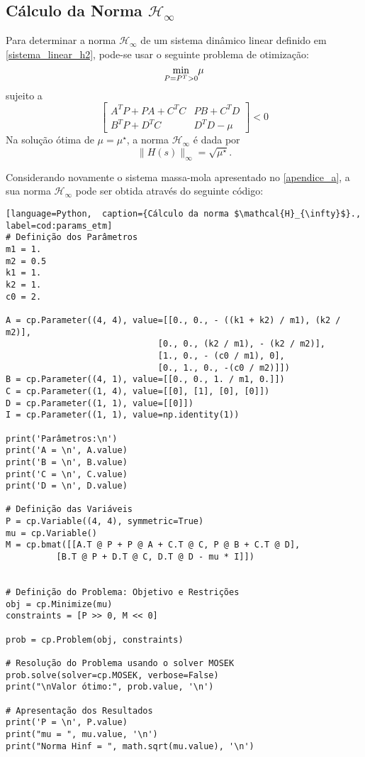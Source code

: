 \subsection{Cálculo da Norma $\mathcal{H}_{\infty}$}

Para determinar a norma $\mathscr{H}_{\infty}$ de um sistema dinâmico linear definido em \eqref{sistema_linear_h2}, pode-se usar o seguinte problema de otimização: $$ \underset{P = P^T > 0}{\min} \space \space \mu $$ sujeito a \begin{equation}
  \begin{bmatrix}
  A^TP + PA + C^TC & PB + C^TD\\
  B^TP + D^TC & D^TD - \mu
  \end{bmatrix} 
  < 0
\end{equation} Na solução ótima de  $\mu = \mu^{\star}$, a norma $\mathscr{H}_{\infty}$ é dada por \begin{equation} \lVert H(s) \rVert _ \infty = \sqrt{\mu ^ \star}. \end{equation}
  
Considerando novamente o sistema massa-mola apresentado no \autoref{apendice_a}, a sua norma $\mathscr{H}_{\infty}$ pode ser obtida através do seguinte código: 

\vspace{8pt}
\begin{lstlisting}[language=Python,  caption={Cálculo da norma $\mathcal{H}_{\infty}$}., label=cod:params_etm]
# Definição dos Parâmetros
m1 = 1.
m2 = 0.5
k1 = 1.
k2 = 1.
c0 = 2.

A = cp.Parameter((4, 4), value=[[0., 0., - ((k1 + k2) / m1), (k2 / m2)],
                              [0., 0., (k2 / m1), - (k2 / m2)],
                              [1., 0., - (c0 / m1), 0],
                              [0., 1., 0., -(c0 / m2)]])
B = cp.Parameter((4, 1), value=[[0., 0., 1. / m1, 0.]])
C = cp.Parameter((1, 4), value=[[0], [1], [0], [0]])
D = cp.Parameter((1, 1), value=[[0]])
I = cp.Parameter((1, 1), value=np.identity(1))

print('Parâmetros:\n')
print('A = \n', A.value)
print('B = \n', B.value)
print('C = \n', C.value)
print('D = \n', D.value)

# Definição das Variáveis
P = cp.Variable((4, 4), symmetric=True)
mu = cp.Variable()
M = cp.bmat([[A.T @ P + P @ A + C.T @ C, P @ B + C.T @ D], 
          [B.T @ P + D.T @ C, D.T @ D - mu * I]])


# Definição do Problema: Objetivo e Restrições
obj = cp.Minimize(mu)
constraints = [P >> 0, M << 0]

prob = cp.Problem(obj, constraints)

# Resolução do Problema usando o solver MOSEK
prob.solve(solver=cp.MOSEK, verbose=False)
print("\nValor ótimo:", prob.value, '\n')

# Apresentação dos Resultados
print('P = \n', P.value)
print("mu = ", mu.value, '\n')
print("Norma Hinf = ", math.sqrt(mu.value), '\n')

\end{lstlisting}


